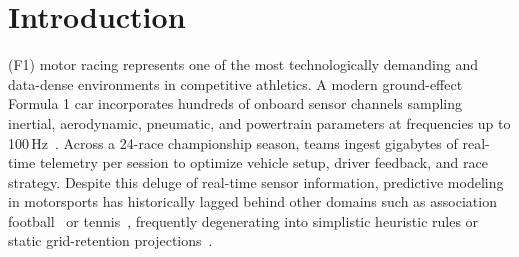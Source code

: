 \documentclass[journal]{IEEEtran}
\begin{document}
\IEEEpeerreviewmaketitle

\section{Introduction}
 (F1) motor racing represents one of the most technologically demanding and data-dense environments in competitive athletics. A modern ground-effect Formula 1 car incorporates hundreds of onboard sensor channels sampling inertial, aerodynamic, pneumatic, and powertrain parameters at frequencies up to 100\,Hz~\cite{milliken1995race, limebeer2015optimal}. Across a 24-race championship season, teams ingest gigabytes of real-time telemetry per session to optimize vehicle setup, driver feedback, and race strategy. Despite this deluge of real-time sensor information, predictive modeling in motorsports has historically lagged behind other domains such as association football~\cite{hvattum2010using, baboota2019predictive} or tennis~\cite{radicchi2011best}, frequently degenerating into simplistic heuristic rules or static grid-retention projections~\cite{phillips2014f1, bell2016formula}.
\end{document}
